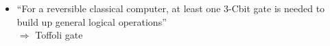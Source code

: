 \documentclass{../doc}
\begin{document}
\begin{itemize}
\begin{itemize}
\begin{itemize}
            \end{itemize}
        \end{itemize}
      \item ``For a reversible classical computer, at least one 3-Cbit gate is needed to build up general logical operations'' \\
        $\Rightarrow$ Toffoli gate
    \end{itemize}
\end{document}
